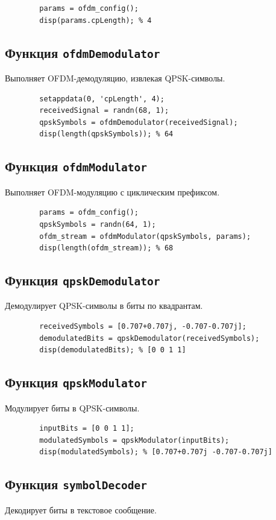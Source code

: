 \documentclass[a4paper,14pt,oneside,openany]{memoir}
\begin{document}
	\begin{lstlisting}
		params = ofdm_config();
		disp(params.cpLength); % 4
	\end{lstlisting}
	
	\subsection{Функция \texttt{ofdmDemodulator}}
	Выполняет OFDM-демодуляцию, извлекая QPSK-символы.
	
	\begin{lstlisting}
		setappdata(0, 'cpLength', 4);
		receivedSignal = randn(68, 1);
		qpskSymbols = ofdmDemodulator(receivedSignal);
		disp(length(qpskSymbols)); % 64
	\end{lstlisting}
	
	\subsection{Функция \texttt{ofdmModulator}}
	Выполняет OFDM-модуляцию с циклическим префиксом.
	
	\begin{lstlisting}
		params = ofdm_config();
		qpskSymbols = randn(64, 1);
		ofdm_stream = ofdmModulator(qpskSymbols, params);
		disp(length(ofdm_stream)); % 68
	\end{lstlisting}
	
	\subsection{Функция \texttt{qpskDemodulator}}
	Демодулирует QPSK-символы в биты по квадрантам.
	
	\begin{lstlisting}
		receivedSymbols = [0.707+0.707j, -0.707-0.707j];
		demodulatedBits = qpskDemodulator(receivedSymbols);
		disp(demodulatedBits); % [0 0 1 1]
	\end{lstlisting}
	
	\subsection{Функция \texttt{qpskModulator}}
	Модулирует биты в QPSK-символы.
	
	\begin{lstlisting}
		inputBits = [0 0 1 1];
		modulatedSymbols = qpskModulator(inputBits);
		disp(modulatedSymbols); % [0.707+0.707j -0.707-0.707j]
	\end{lstlisting}
	
	\subsection{Функция \texttt{symbolDecoder}}
	Декодирует биты в текстовое сообщение.
	
\end{document}
